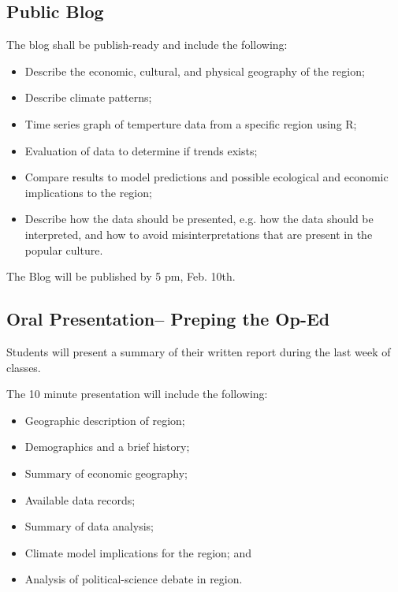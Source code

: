\documentclass{article}\usepackage[]{graphicx}\usepackage[]{color}
\begin{document}
\subsection{Public Blog}

The blog shall be publish-ready and include the following: 

\begin{itemize}
  \item Describe the economic, cultural, and physical geography of the region;
  \item Describe climate patterns;
  \item Time series graph of temperture data from a specific region using R;
  \item Evaluation of data to determine if trends exists;
  \item Compare results to model predictions and possible ecological and economic implications to the region; 
  \item Describe how the data should be presented, e.g. how the data should be interpreted, and how to avoid misinterpretations that are present in the popular culture.
  
\end{itemize}

The Blog will be published by 5 pm, Feb. 10th.

\subsection{Oral Presentation-- Preping the Op-Ed}

Students will present a summary of their written report during the last week of classes. 

The 10 minute presentation will include the following:

\begin{itemize}
  \item Geographic description of region;
  \item Demographics and a brief history;
  \item Summary of economic geography;
  \item Available data records;
  \item Summary of data analysis;
  \item Climate model implications for the region; and
  \item Analysis of political-science debate in region.
  
\end{itemize}
\end{document}
